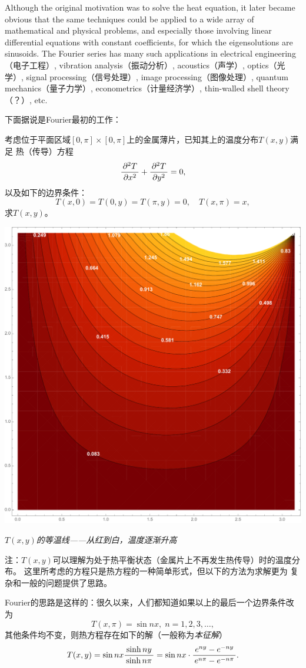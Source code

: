 \begin{shaded}
{		Although the original motivation was to solve the heat equation, 
		it later became obvious that the same techniques could be applied 
		to a wide array of mathematical and physical problems, and 
		especially those involving linear differential equations with 
		constant coefficients, for which the eigensolutions are sinusoids. 
		The Fourier series has many such applications in electrical 
		engineering（电子工程）, vibration analysis（振动分析）, acoustics（声学）, 
		optics（光学）, signal processing（信号处理）, image processing（图像处理）, 
		quantum mechanics（量子力学）, econometrics（计量经济学）, 
		thin-walled shell theory（？）, etc.
	}
	
	下面据说是Fourier最初的工作：
	
	考虑位于平面区域$[0,\pi]\times[0,\pi]$上的金属薄片，已知其上的温度分布$T(x,y)$满足
	{\kaishu 热（传导）方程}
	$$\displaystyle\frac{\,{\partial^2T}\,}{\,{\partial x^2}\,}+\displaystyle\frac{\,{\partial^2T}\,}{\,{\partial y^2}\,}=0,$$
	以及如下的边界条件：
	$$T(x,0)=T(0,y)=T(\pi,y)=0,\quad T(x,\pi)=x,$$
	求$T(x,y)$。
	
	\begin{center}
		\includegraphics[width=.6\textwidth]{./images/ch12/heatPlane.pdf}
		
		{\it $T(x,y)$的等温线——从红到白，温度逐渐升高}
	\end{center}
	
	注：$T(x,y)$可以理解为处于热平衡状态（金属片上不再发生热传导）时的温度分布。
	这里所考虑的方程只是热方程的一种简单形式，但以下的方法为求解更为
	复杂和一般的问题提供了思路。
	
	Fourier的思路是这样的：很久以来，人们都知道如果以上的最后一个边界条件改为
	$$T(x,\pi)=\sin nx,\;n=1,2,3,\ldots,$$
	其他条件均不变，则热方程存在如下的解（一般称为{\it 本征解}）
	$$T(x,y)=\sin nx\displaystyle\frac{\,{\sinh ny}\,}{\,{\sinh n\pi}\,}
	=\sin nx\cdot\displaystyle\frac{\,{e^{ny}-e^{-ny}}\,}{\,{e^{n\pi}-e^{-n\pi}}\,}.$$
	

\end{shaded}
